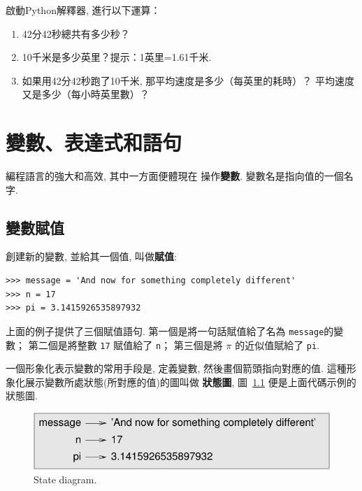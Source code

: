 \documentclass[10pt]{book}
\begin{document}
\begin{exercise}

啟動Python解釋器, 進行以下運算：

\begin{enumerate}

\item 42分42秒總共有多少秒？

\item 10千米是多少英里？提示：1英里=1.61千米. 

\item 如果用42分42秒跑了10千米, 那平均速度是多少（每英里的耗時）？
平均速度又是多少（每小時英里數）？


\end{enumerate}

\end{exercise}


\chapter{變數、表達式和語句}

編程語言的強大和高效, 其中一方面便體現在 操作{\bf 變數}. 
變數名是指向值的一個名字. 


\section{變數賦值}
\label{variables}

創建新的變數, 並給其一個值, 叫做{\bf 賦值}: 

\begin{verbatim}
>>> message = 'And now for something completely different'
>>> n = 17
>>> pi = 3.1415926535897932
\end{verbatim}
%
上面的例子提供了三個賦值語句. 
第一個是將一句話賦值給了名為 {\tt message}的變數；
第二個是將整數 {\tt 17} 賦值給了 {\tt n}；
第三個是將 $\pi$ 的近似值賦給了 {\tt pi}. 

一個形象化表示變數的常用手段是, 定義變數, 然後畫個箭頭指向對應的值. 
這種形象化展示變數所處狀態(所對應的值)的圖叫做 {\bf 狀態圖}, 
圖~\ref{fig.state2} 便是上面代碼示例的狀態圖. 

\begin{figure}
\centerline
{\includegraphics[scale=0.8]{figs/state2.pdf}}
\caption{State diagram.}
\label{fig.state2}
\end{figure}
\end{document}
